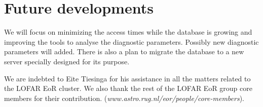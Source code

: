 \section{Future developments}
We will focus on minimizing the access times while the database is growing and improving the tools to analyse the diagnostic parameters. Possibly new diagnostic parameters will added. There is also a plan to migrate the database to a new server specially designed for its purpose. 

\acknowledgements We are indebted to Eite Tiesinga for his assistance in all the matters related to the LOFAR EoR cluster. We also thank the rest of the LOFAR EoR group core members for their contribution. \newline (\textit{www.astro.rug.nl/eor/people/core-members}).
